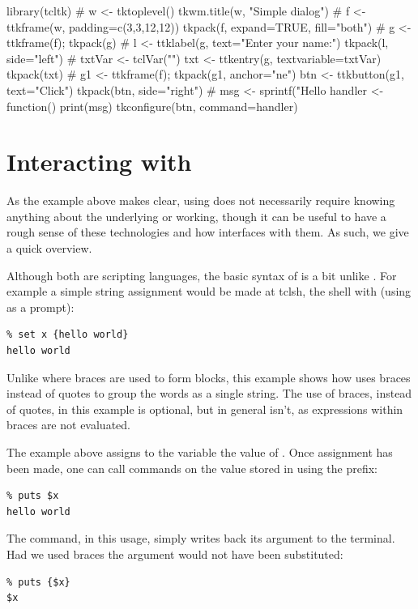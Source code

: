 \begin{Schunk}
\begin{Sinput}
 library(tcltk)
 #
 w <- tktoplevel()
 tkwm.title(w, "Simple dialog")
 #
 f <- ttkframe(w, padding=c(3,3,12,12))
 tkpack(f, expand=TRUE, fill="both")
 #
 g <- ttkframe(f); tkpack(g)
 #
 l <- ttklabel(g, text="Enter your name:")
 tkpack(l, side="left")
 #
 txtVar <- tclVar("")
 txt <- ttkentry(g, textvariable=txtVar)
 tkpack(txt)
 #
 g1 <- ttkframe(f); tkpack(g1, anchor="ne")
 btn <- ttkbutton(g1, text="Click")
 tkpack(btn, side="right")
 #
 msg <- sprintf("Hello %
 handler <- function() print(msg)
 tkconfigure(btn, command=handler)
\end{Sinput}
\end{Schunk}



\section{Interacting with \TCL}
\label{sec:tcltk:interacting-with-tcl}

As the example above makes clear, using  does not
necessarily require knowing anything about the underlying \Tk{} or
\Tcl{} working, though it can be useful to have a rough sense of these
technologies and how  interfaces with them. As such, we
give a quick overview.


Although both are scripting languages, the basic syntax of \TCL\/ is a
bit unlike \R. For example a simple string assignment would be made at
tclsh, the \TCL\/ shell with (using \code{\%} as a prompt):
\begin{verbatim}
% set x {hello world}
hello world
\end{verbatim}
Unlike \R\/ where braces are used to form blocks, this example shows
how \TCL\/ uses braces instead of quotes to group the words as a
single string. The use of braces, instead of quotes, in this example
is optional, but in general isn't, as expressions within braces are
not evaluated.  

The example above assigns to the variable  the
value of . Once assignment has been made, one can
call commands on the value stored in  using the \code{\$}
prefix:
\begin{verbatim}
% puts $x
hello world
\end{verbatim}
The  command, in this usage, simply writes back its argument to the terminal. Had
we used braces the argument would not have been substituted:
\begin{verbatim}
% puts {$x}
$x
\end{verbatim}

